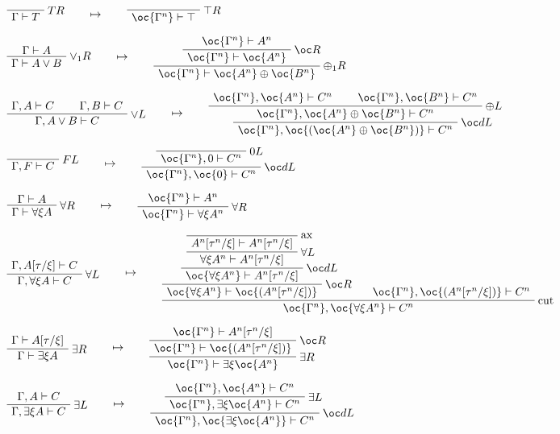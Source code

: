 \(\LabelRule{T R}
\NulRule{\Gamma\vdash T}
\DisplayProof
\qquad\mapsto\qquad
\LabelRule{\top R}
\NulRule{\oc{\Gamma^n}\vdash \top}
\DisplayProof\)

\(\AxRule{\Gamma\vdash A}
\LabelRule{\vee_1 R}
\UnaRule{\Gamma\vdash A\vee B}
\DisplayProof
\qquad\mapsto\qquad
\AxRule{\oc{\Gamma^n}\vdash A^n}
\LabelRule{\oc R}
\UnaRule{\oc{\Gamma^n}\vdash \oc{A^n}}
\LabelRule{\plus_1 R}
\UnaRule{\oc{\Gamma^n}\vdash \oc{A^n}\plus\oc{B^n}}
\DisplayProof\)

\(\AxRule{\Gamma,A\vdash C}
\AxRule{\Gamma,B\vdash C}
\LabelRule{\vee L}
\BinRule{\Gamma,A\vee B\vdash C}
\DisplayProof
\qquad\mapsto\qquad
\AxRule{\oc{\Gamma^n},\oc{A^n}\vdash C^n}
\AxRule{\oc{\Gamma^n},\oc{B^n}\vdash C^n}
\LabelRule{\plus L}
\BinRule{\oc{\Gamma^n},\oc{A^n}\plus\oc{B^n}\vdash C^n}
\LabelRule{\oc d L}
\UnaRule{\oc{\Gamma^n},\oc{(\oc{A^n}\plus\oc{B^n})}\vdash C^n}
\DisplayProof\)

\(\LabelRule{F L}
\NulRule{\Gamma,F\vdash C}
\DisplayProof
\qquad\mapsto\qquad
\LabelRule{\zero L}
\NulRule{\oc{\Gamma^n},\zero\vdash C^n}
\LabelRule{\oc d L}
\UnaRule{\oc{\Gamma^n},\oc{\zero}\vdash C^n}
\DisplayProof\)

\(\AxRule{\Gamma\vdash A}
\LabelRule{\forall R}
\UnaRule{\Gamma\vdash \forall\xi A}
\DisplayProof
\qquad\mapsto\qquad
\AxRule{\oc{\Gamma^n}\vdash A^n}
\LabelRule{\forall R}
\UnaRule{\oc{\Gamma^n}\vdash \forall\xi A^n}
\DisplayProof\)

\(\AxRule{\Gamma,A[\tau/\xi]\vdash C}
\LabelRule{\forall L}
\UnaRule{\Gamma,\forall\xi A\vdash C}
\DisplayProof
\qquad\mapsto\qquad
\LabelRule{\rulename{ax}}
\NulRule{A^n[\tau^n/\xi]\vdash A^n[\tau^n/\xi]}
\LabelRule{\forall L}
\UnaRule{\forall\xi A^n\vdash A^n[\tau^n/\xi]}
\LabelRule{\oc d L}
\UnaRule{\oc{\forall\xi A^n}\vdash A^n[\tau^n/\xi]}
\LabelRule{\oc R}
\UnaRule{\oc{\forall\xi A^n}\vdash \oc{(A^n[\tau^n/\xi])}}
\AxRule{\oc{\Gamma^n},\oc{(A^n[\tau^n/\xi])}\vdash C^n}
\LabelRule{\rulename{cut}}
\BinRule{\oc{\Gamma^n},\oc{\forall\xi A^n}\vdash C^n}
\DisplayProof\)

\(\AxRule{\Gamma\vdash A[\tau/\xi]}
\LabelRule{\exists R}
\UnaRule{\Gamma\vdash \exists\xi A}
\DisplayProof
\qquad\mapsto\qquad
\AxRule{\oc{\Gamma^n}\vdash A^n[\tau^n/\xi]}
\LabelRule{\oc R}
\UnaRule{\oc{\Gamma^n}\vdash \oc{(A^n[\tau^n/\xi])}}
\LabelRule{\exists R}
\UnaRule{\oc{\Gamma^n}\vdash \exists\xi\oc{A^n}}
\DisplayProof\)

\(\AxRule{\Gamma,A\vdash C}
\LabelRule{\exists L}
\UnaRule{\Gamma,\exists\xi A\vdash C}
\DisplayProof
\qquad\mapsto\qquad
\AxRule{\oc{\Gamma^n},\oc{A^n}\vdash C^n}
\LabelRule{\exists L}
\UnaRule{\oc{\Gamma^n},\exists\xi\oc{A^n}\vdash C^n}
\LabelRule{\oc d L}
\UnaRule{\oc{\Gamma^n},\oc{\exists\xi\oc{A^n}}\vdash C^n}
\DisplayProof\)

